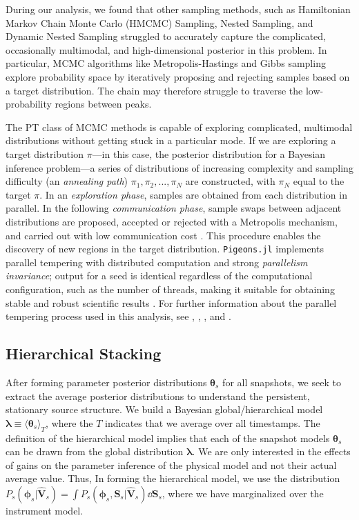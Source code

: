\documentclass[linenumbers, twocolumn, tighten]{aastex701}
\begin{document}
During our analysis, we found that other sampling methods, such as Hamiltonian Markov Chain Monte Carlo (HMCMC) Sampling, Nested Sampling, and Dynamic Nested Sampling struggled to accurately capture the complicated, occasionally multimodal, and high-dimensional posterior in this problem. In particular, MCMC algorithms like Metropolis-Hastings and Gibbs sampling explore probability space by iteratively proposing and rejecting samples based on a target distribution. The chain may therefore struggle to traverse the low-probability regions between peaks.

The PT class of MCMC methods is capable of exploring complicated, multimodal distributions without getting stuck in a particular mode. If we are exploring a target distribution $\pi$---in this case, the posterior distribution for a Bayesian inference problem---a series of distributions of increasing complexity and sampling difficulty (an \textit{annealing path}) $\pi_1, \pi_2, ..., \pi_N$ are constructed, with $\pi_N$ equal to the target $\pi$. In an \textit{exploration phase}, samples are obtained from each distribution in parallel. In the following \textit{communication phase}, sample swaps between adjacent distributions are proposed, accepted or rejected with a Metropolis mechanism, and carried out with low communication cost \citep{10.1111/rssb.12464}. This procedure enables the discovery of new regions in the target distribution. \texttt{Pigeons.jl} implements parallel tempering with distributed computation and strong \textit{parallelism invariance}; output for a seed is identical regardless of the computational configuration, such as the number of threads, making it suitable for obtaining stable and robust scientific results \citep{2023arXiv230809769S}. For further information about the parallel tempering process used in this analysis, see \citealt{10.1111/rssb.12464}, \citealt{NEURIPS2022_03cd3cf3}, \citealt{2023arXiv230809769S}, and \citealt{pmlr-v238-biron-lattes24a}.


\subsection{Hierarchical Stacking} \label{sec:stacking}

After forming parameter posterior distributions $\boldsymbol{\theta}_s$ for all snapshots, we seek to extract the average posterior distributions to understand the persistent, stationary source structure. We build a Bayesian global/hierarchical model $\boldsymbol{\lambda} \equiv \langle\boldsymbol{\theta}_s\rangle_T$, where the $T$ indicates that we average over all timestamps. The definition of the hierarchical model implies that each of the snapshot models $\boldsymbol{\theta}_s$ can be drawn from the global distribution $\boldsymbol{\lambda}$.
We are only interested in the effects of gains on the parameter inference of the physical model and not their actual average value. 
Thus, In forming the hierarchical model, we use the distribution $P_s(\boldsymbol{\phi}_s|\boldsymbol{\hat{V}}_s) = \int P_s(\boldsymbol{\phi}_s,\boldsymbol{S}_s|\boldsymbol{\hat{V}}_s)\dd{\boldsymbol{S}_s}$, where we have marginalized over the instrument model.
\end{document}
